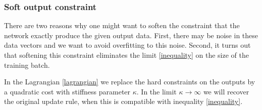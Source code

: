 \documentclass[12pt]{article}
\begin{document}
\subsubsection*{Soft output constraint}

There are two reasons why one might want to soften the constraint that the network exactly produce the given output data. First, there may be noise in these data vectors and we want to avoid overfitting to this noise. Second, it turns out that softening this constraint  eliminates the limit \eqref{inequality} on the size of the training batch.

In the Lagrangian \eqref{lagrangian} we replace the hard constraints on the outputs by a quadratic cost with stiffness parameter $\kappa$. In the limit $\kappa\to\infty$ we will recover the original update rule, when this is compatible with inequality \eqref{inequality}.
\end{document}
